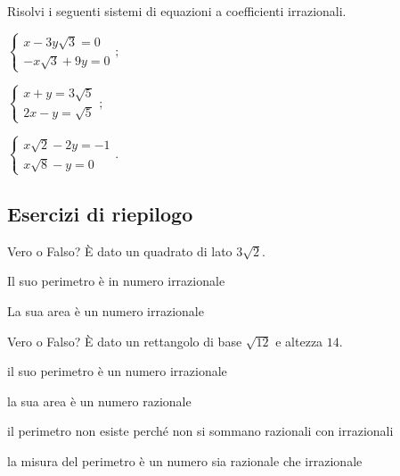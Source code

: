 \begin{esercizio}[\Ast]
 \label{ese:2.109}
Risolvi i seguenti sistemi di equazioni a coefficienti irrazionali.
 \begin{multicols}{2}
 \begin{enumeratea}
 \item $\left\{\begin{array}{l}x-3y\sqrt 3=0\\
 -x\sqrt 3+9y=0 \end{array}\right.;$
 \item $\left\{\begin{array}{l}x+y=3\sqrt 5\\
 2x-y=\sqrt 5 \end{array}\right.;$
 \item $\left\{\begin{array}{l}x\sqrt 2-2y=-1\\
 x\sqrt 8-y=0 \end{array}\right..$
 \end{enumeratea}
 \end{multicols}
\end{esercizio}

\subsection*{Esercizi di riepilogo}

\begin{esercizio}%
Vero o Falso? È dato un quadrato di lato $3\sqrt 2$.

\TabPositions{11.5cm}
 \begin{enumeratea}
 \item Il suo perimetro è in numero irrazionale \tab\boxV\quad\boxF
 \item La sua area è un numero irrazionale\tab\boxV\quad\boxF
 \end{enumeratea}
\end{esercizio}

\begin{esercizio}%
Vero o Falso? È dato un rettangolo di base $\sqrt{12}$ e altezza $14$.

\TabPositions{11.5cm}
 \begin{enumeratea}
 \item il suo perimetro è un numero irrazionale \tab\boxV\quad\boxF
 \item la sua area è un numero razionale \tab\boxV\quad\boxF
 \item il perimetro non esiste perché non si sommano razionali con irrazionali \tab\boxV\quad\boxF
 \item la misura del perimetro è un numero sia razionale che irrazionale \tab\boxV\quad\boxF
 \end{enumeratea}
\end{esercizio}

